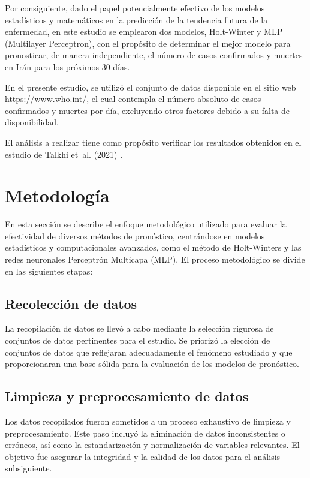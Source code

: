 \documentclass[
  us-letterpaper,
]{scrreprt}
\theoremstyle{plain}
\theoremstyle{definition}
\theoremstyle{definition}
\theoremstyle{plain}
\theoremstyle{remark}
\begin{document}
Por consiguiente, dado el papel potencialmente efectivo de los modelos
estadísticos y matemáticos en la predicción de la tendencia futura de la
enfermedad, en este estudio se emplearon dos modelos, Holt-Winter y MLP
(Multilayer Perceptron), con el propósito de determinar el mejor modelo
para pronosticar, de manera independiente, el número de casos
confirmados y muertes en Irán para los próximos 30 días.

En el presente estudio, se utilizó el conjunto de datos disponible en el
sitio web \url{https://www.who.int/,} el cual contempla el número
absoluto de casos confirmados y muertes por día, excluyendo otros
factores debido a su falta de disponibilidad.

El análisis a realizar tiene como propósito verificar los resultados
obtenidos en el estudio de Talkhi et~al. (2021) .

\chapter{Metodología}\label{metodologuxeda}

En esta sección se describe el enfoque metodológico utilizado para
evaluar la efectividad de diversos métodos de pronóstico, centrándose en
modelos estadísticos y computacionales avanzados, como el método de
Holt-Winters y las redes neuronales Perceptrón Multicapa (MLP). El
proceso metodológico se divide en las siguientes etapas:

\section{Recolección de datos}\label{recolecciuxf3n-de-datos}

La recopilación de datos se llevó a cabo mediante la selección rigurosa
de conjuntos de datos pertinentes para el estudio. Se priorizó la
elección de conjuntos de datos que reflejaran adecuadamente el fenómeno
estudiado y que proporcionaran una base sólida para la evaluación de los
modelos de pronóstico.

\section{Limpieza y preprocesamiento de
datos}\label{limpieza-y-preprocesamiento-de-datos}

Los datos recopilados fueron sometidos a un proceso exhaustivo de
limpieza y preprocesamiento. Este paso incluyó la eliminación de datos
inconsistentes o erróneos, así como la estandarización y normalización
de variables relevantes. El objetivo fue asegurar la integridad y la
calidad de los datos para el análisis subsiguiente.
\end{document}
